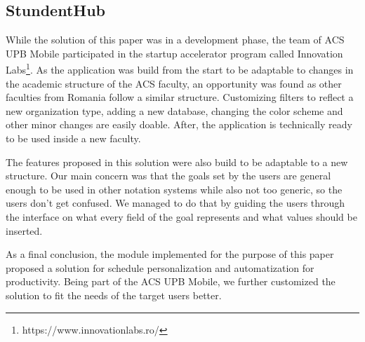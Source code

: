 \subsection{StundentHub} \label{7:follow}
While the solution of this paper was in a development phase, the team of ACS UPB Mobile participated in the startup accelerator program called Innovation Labs\footnote{https://www.innovationlabs.ro/}.
As the application was build from the start to be adaptable to changes in the academic structure of the ACS faculty, an opportunity was found as other faculties from Romania follow a similar structure. Customizing filters to reflect a new organization type, adding a new database, changing the color scheme and other minor changes are easily doable. After, the application is technically ready to be used inside a new faculty. 

The features proposed in this solution were also build to be adaptable to a new structure. Our main concern was that the goals set by the users are general enough to be used in other notation systems while also not too generic, so the users don’t get confused. We managed to do that by guiding the users through the interface on what every field of the goal represents and what values should be inserted.

As a final conclusion, the module implemented for the purpose of this paper proposed a solution for schedule personalization and automatization for productivity. Being part of the ACS UPB Mobile, we further customized the solution to fit the needs of the target users better. 
\clearpage